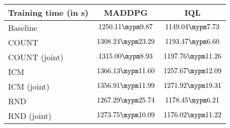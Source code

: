 \begin{tabular}{l | c c}
	Training time (in s) & MADDPG & IQL\\ \toprule
		Baseline & $1250.11 \mypm 9.87$ & $1149.04 \mypm 7.73$ \\ \midrule
	COUNT & $1308.24 \mypm 23.29$ & $1193.47 \mypm 6.60$ \\
	COUNT (joint) & $1315.00 \mypm 8.93$ & $1197.76 \mypm 11.26$ \\\midrule
	ICM & $1366.13 \mypm 11.60$ & $1257.67 \mypm 12.09$ \\
	ICM (joint) & $1356.91 \mypm 11.99$ & $1271.92 \mypm 19.31$ \\\midrule
	RND & $1267.29 \mypm 25.74$ & $1178.45 \mypm 6.21$ \\
	RND (joint) & $1273.75 \mypm 10.09$ & $1176.02 \mypm 11.22$ \\\midrule
\end{tabular}
